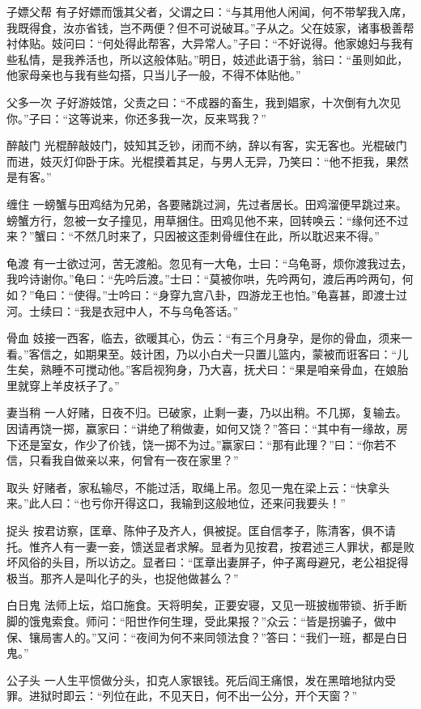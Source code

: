 \documentclass[12pt,UTF8]{ctexbook}
\begin{document}
子嫖父帮
有子好嫖而饿其父者，父谓之曰：“与其用他人闲闻，何不带挈我入席，我既得食，汝亦省钱，岂不两便？但不可说破耳。”子从之。父在妓家，诸事极善帮衬体贴。妓问曰：“何处得此帮客，大异常人。”子曰：“不好说得。他家媳妇与我有些私情，是我养活也，所以这般体贴。”明日，妓述此语于翁，翁曰：“虽则如此，他家母亲也与我有些勾搭，只当儿子一般，不得不体贴他。”

父多一次
子好游妓馆，父责之曰：“不成器的畜生，我到娼家，十次倒有九次见你。”子曰：“这等说来，你还多我一次，反来骂我？”

醉敲门
光棍醉敲妓门，妓知其乏钞，闭而不纳，辞以有客，实无客也。光棍破门而进，妓灭灯仰卧于床。光棍摸着其足，与男人无异，乃笑曰：“他不拒我，果然是有客。”

缠住
一螃蟹与田鸡结为兄弟，各要赌跳过涧，先过者居长。田鸡溜便早跳过来。螃蟹方行，忽被一女子撞见，用草捆住。田鸡见他不来，回转唤云：“缘何还不过来？”蟹曰：“不然几时来了，只因被这歪刺骨缠住在此，所以耽迟来不得。”

龟渡
有一士欲过河，苦无渡船。忽见有一大龟，士曰：“乌龟哥，烦你渡我过去，我吟诗谢你。”龟曰：“先吟后渡。”士曰：“莫被你哄，先吟两句，渡后再吟两句，何如？”龟曰：“使得。”士吟曰：“身穿九宫八卦，四游龙王也怕。”龟喜甚，即渡士过河。士续曰：“我是衣冠中人，不与乌龟答话。”

骨血
妓接一西客，临去，欲暖其心，伪云：“有三个月身孕，是你的骨血，须来一看。”客信之，如期果至。妓计困，乃以小白犬一只置儿篮内，蒙被而诳客曰：“儿生矣，熟睡不可搅动他。”客启视狗身，乃大喜，抚犬曰：“果是咱亲骨血，在娘胎里就穿上羊皮袄子了。”

妻当稍
一人好赌，日夜不归。已破家，止剩一妻，乃以出稍。不几掷，复输去。因请再饶一掷，赢家曰：“讲绝了稍做妻，如何又饶？”答曰：“其中有一缘故，房下还是室女，作少了价钱，饶一掷不为过。”赢家曰：“那有此理？”曰：“你若不信，只看我自做亲以来，何曾有一夜在家里？”

取头
好赌者，家私输尽，不能过活，取绳上吊。忽见一鬼在梁上云：“快拿头来。”此人曰：“也亏你开得这口，我输到这般地位，还来问我要头！”

捉头
按君访察，匡章、陈仲子及齐人，俱被捉。匡自信孝子，陈清客，俱不请托。惟齐人有一妻一妾，馈送显者求解。显者为见按君，按君述三人罪状，都是败坏风俗的头目，所以访之。显者曰：“匡章出妻屏子，仲子离母避兄，老公祖捉得极当。那齐人是叫化子的头，也捉他做甚么？”

白日鬼
法师上坛，焰口施食。天将明矣，正要安寝，又见一班披枷带锁、折手断脚的饿鬼索食。师问：“阳世作何生理，受此果报？”众云：“皆是拐骗子，做中保、镶局害人的。”又问：“夜间为何不来同领法食？”答曰：“我们一班，都是白日鬼。”

公子头
一人生平惯做分头，扣克人家银钱。死后阎王痛恨，发在黑暗地狱内受罪。进狱时即云：“列位在此，不见天日，何不出一公分，开个天窗？”
\end{document}

